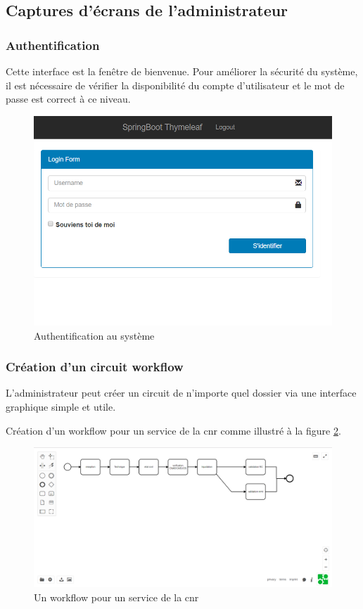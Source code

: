 

 \subsection{Captures d'écrans de l'administrateur }
  \subsubsection{Authentification}
Cette interface est la fenêtre de bienvenue.
Pour améliorer la sécurité du système, il est nécessaire de vérifier la disponibilité du compte d'utilisateur et le mot de passe est correct à ce niveau.
 \begin{figure}[H]
 	\centering
 	\includegraphics[width=1\linewidth]{images/captures/capturesadmin/login}
 	\caption{Authentification au système }
 	\label{fig:login}
 \end{figure}
  
  
  
  
 \subsubsection{Création d'un circuit workflow}
L'administrateur peut créer un circuit de n'importe quel dossier via une interface graphique simple et utile.
\begin{exmp}
 Création d'un workflow pour un service de la \ac{cnr} comme illustré à la figure \ref{fig:bpmn}. 
\end{exmp}
 
\begin{figure}[H]
	\centering
	\includegraphics[width=1\linewidth]{images/captures/capturesadmin/bpmn}
	\caption{Un workflow pour un service de la \ac{cnr}}
	\label{fig:bpmn}
\end{figure}
  
